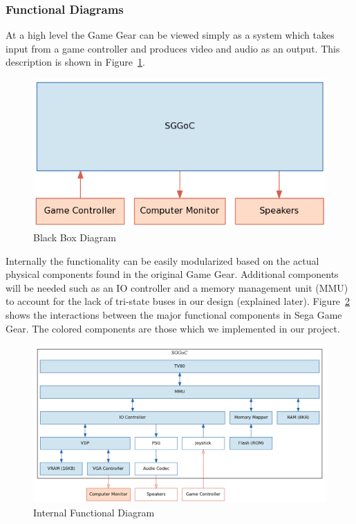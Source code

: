 \documentclass{article}
\begin{document}
\newpage
\subsubsection{Functional Diagrams}
At a high level the Game Gear can be viewed simply as a system which takes
input from a game controller and produces video and audio as an output. This
description is shown in Figure~\ref{fig:external}.

\begin{figure}[H]
\centering
\includegraphics[scale=0.4]{../block_diagrams/block_diagram_external.png}
\caption{Black Box Diagram}
\label{fig:external}
\end{figure}

Internally the functionality can be easily modularized based on the actual
physical components found in the original Game Gear. Additional components will
be needed such as an IO controller and a memory management unit (MMU) to
account for the lack of tri-state buses in our design (explained later).
Figure~\ref{fig:internal} shows the interactions between the major functional
components in Sega Game Gear. The colored components are those which we
implemented in our project.

\begin{figure}[H]
\centering
\includegraphics[scale=0.4]{../block_diagrams/block_diagram_internal_implemented.png}
\caption{Internal Functional Diagram}
\label{fig:internal}
\end{figure}
\end{document}
